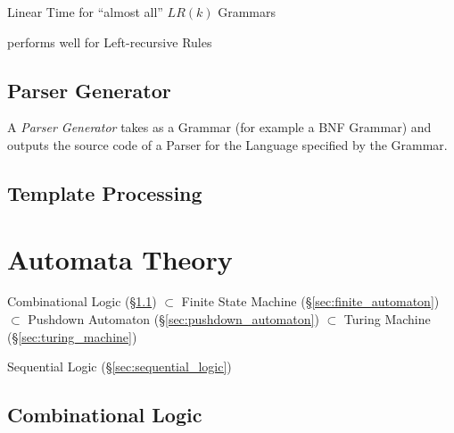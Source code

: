 Linear Time for ``almost all'' $LR(k)$ Grammars %

performs well for Left-recursive Rules



\subsection{Parser Generator}\label{sec:parser_generator}

A \emph{Parser Generator} takes as a Grammar (for example a BNF
Grammar) and outputs the source code of a Parser for the Language
specified by the Grammar.



\subsection{Template Processing}\label{sec:template_processing}



\section{Automata Theory}\label{sec:automata_theory}


Combinational Logic (\S\ref{sec:combinational_logic})
$\subset$ Finite State Machine (\S\ref{sec:finite_automaton})
$\subset$ Pushdown Automaton (\S\ref{sec:pushdown_automaton})
$\subset$ Turing Machine (\S\ref{sec:turing_machine})

Sequential Logic (\S\ref{sec:sequential_logic})




\subsection{Combinational Logic}\label{sec:combinational_logic}

